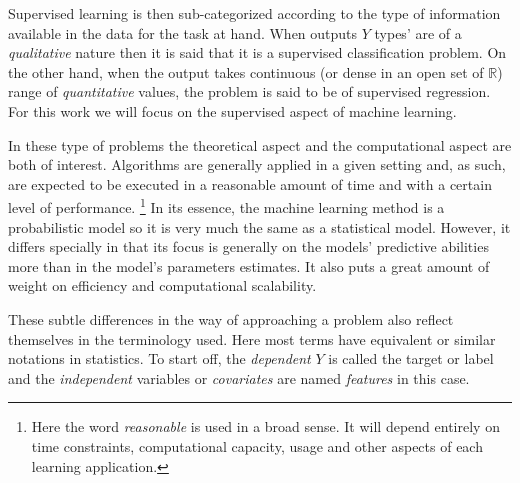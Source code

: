 Supervised learning is then sub-categorized according to the type of information available in the data for the task at hand. When outputs $Y$ types' are of a \textit{qualitative} nature then it is said that it is a supervised classification problem. On the other hand, when the output takes continuous (or dense in an open set of $\mathbb{R}$) range of \textit{quantitative} values, the problem is said to be of supervised regression. For this work we will focus on the supervised aspect of machine learning.

In these type of problems the theoretical aspect and the computational aspect are both of interest. Algorithms are generally applied in a given setting and, as such, are expected to be executed in a reasonable amount of time and with a certain level of performance. \footnote{Here the word \textit{reasonable} is used in a broad sense. It will depend entirely on time constraints, computational capacity, usage and other aspects of each learning application.} In its essence, the machine learning method is a probabilistic model so it is very much the same as a statistical model. However, it differs specially in that its focus is generally on the models' predictive abilities more than in the model's parameters estimates.\cite{breiman-statisticalmodeling} It also puts a great amount of weight on efficiency and computational scalability. 


These subtle differences in the way of approaching a problem also reflect themselves in the terminology used. Here most terms have equivalent or similar notations in statistics. To start off, the \textit{dependent} $Y$ is called the target or label and the \textit{independent} variables or \textit{covariates} are named \textit{features} in this case. 

